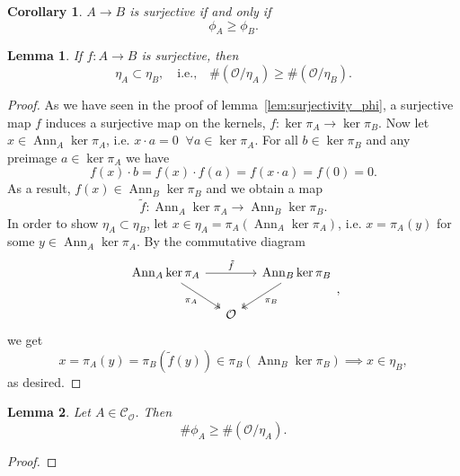 \documentclass{article}
\theoremstyle{plain}%
\newtheorem{lemma}{Lemma}[section]
\newtheorem{corollary}{Corollary}[section]
\theoremstyle{definition}
\theoremstyle{remark}
\newcommand{\co}{\mathcal{C}_\mathcal{O}}
\newcommand{\ann}{\operatorname{Ann}}
\begin{document}
    \begin{corollary}\label{cor:surjectivity_phi}
        \(A \to B\) is surjective if and only if \[\phi_A \geq \phi_B.\]
    \end{corollary}

    \begin{lemma}
        If \(f \colon A \to B\) is surjective, then
        \begin{equation}
            \eta_A \subset \eta_B, \quad \text{i.e.,}\quad \#(\mathcal{O}/\eta_A) \geq \#(\mathcal{O}/\eta_B).  
        \end{equation}
    \end{lemma}
    \begin{proof}
        As we have seen in the proof of lemma~\ref{lem:surjectivity_phi}, a surjective map \(f\) induces a surjective
        map on the kernels, \(f\colon \ker \pi_A \to \ker\pi_B\).
        Now let \(x \in \ann_A \ker \pi_A\), i.e. \(x \cdot a = 0\;\; \forall a \in \ker \pi_A\).
        For all \(b \in \ker \pi_B\) and any preimage \(a \in \ker \pi_A\) we have
        \[
            f(x) \cdot b = f(x) \cdot f(a) = f(x \cdot a) = f(0) = 0.
        \]
        As a result, \(f(x) \in \ann_B\ker \pi_B\) and we obtain a map
        \[
            \tilde f\colon\ann_A\ker \pi_A \to \ann_B \ker \pi_B.  
        \]
        In order to show \(\eta_A \subset \eta_B\), let \(x \in \eta_A = \pi_A(\ann_A \ker \pi_A)\), i.e.
        \(x = \pi_A(y)\) for some \(y \in \ann_A \ker \pi_A\). By the commutative diagram
        \[
        \begin{tikzcd}[column sep=small]
            \ann_A \ker \pi_A \arrow[rr, "\tilde f"] \arrow [dr, "\pi_A", swap, twoheadrightarrow] & & \ann_B \ker \pi_B \arrow [dl, "\pi_B", twoheadrightarrow]\\
            & \mathcal{O} &
        \end{tikzcd},
        \]
        we get
        \[
            x = \pi_A(y) = \pi_B(\tilde f(y)) \in \pi_B(\ann_B \ker \pi_B) \implies x \in \eta_B,
        \]
        as desired.
    \end{proof}

    \begin{lemma}\label{lem:standard_ineq}
        Let \(A \in \co\). Then \[\#\phi_A \geq \#(\mathcal{O}/\eta_A).\]
    \end{lemma}
    \begin{proof}
    \end{proof}
\end{document}

